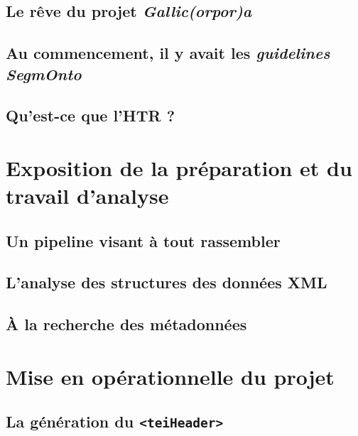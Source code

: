 \documentclass[a4paper,12pt,twoside]{book}
\begin{document}
	\chapter{Le rêve du projet \textit{Gallic(orpor)a}}
	
	\label{chap.3}
	
	\chapter{Au commencement, il y avait les \textit{guidelines SegmOnto}}
	\label{chap:segmonto}
	
	
	\chapter{Qu'est-ce que l'HTR ?}
	
	\label{chap:htr}
	
	\part{Exposition de la préparation et du travail d'analyse}
	\label{part2}

	\chapter{Un pipeline visant à tout rassembler}
	
	\label{chap:pipeline}
	
	\chapter{L'analyse des structures des données XML}
	
	\label{chap:xml}
	
	\chapter{À la recherche des métadonnées}
	
	\label{chap:metadata}
	
	\part{Mise en opérationnelle du projet}
	\label{part3}
	
	\chapter{La génération du \texttt{<teiHeader>}}
	
	\label{chap:header}
	
\end{document}
